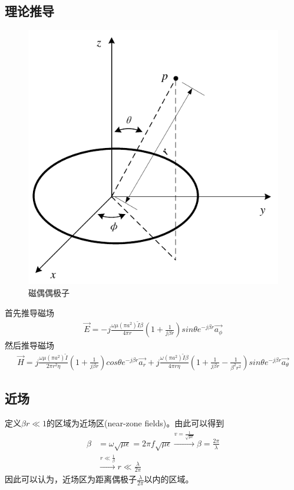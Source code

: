 \documentclass[lang=cn,11pt]{elegantpaper}
\begin{document}
\subsection{理论推导}
\begin{figure}[ht]
  \centering
  \includegraphics[width=0.3\linewidth]{figure//Magnetic_Dipole.pdf}
  \vspace{-0.3cm}
  \caption{磁偶偶极子}\label{fig:Magnetic_Dipole}
\end{figure}
首先推导磁场
\begin{equation}
  \begin{aligned}
    \vec{E} = -j\frac{\omega \mu (\pi a^2)\widetilde{I}\beta}{4\pi r}\left(1+\frac{1}{j\beta r}\right)sin\theta e^{-j\beta r}\vec{a_{\phi}}
\end{aligned}
\end{equation}
然后推导磁场
\begin{equation}
  \begin{aligned}
    \vec{H} = j\frac{\omega \mu (\pi a^2)\widetilde{I}}{2\pi r^2\eta}\left(1+\frac{1}{j\beta r}\right)cos\theta e^{-j\beta r}\vec{a_r} + j\frac{\omega (\pi a^2)\widetilde{I}\beta}{4\pi r \eta}\left(1+\frac{1}{j\beta r} - \frac{1}{{\beta}^2 r^2}\right)sin\theta e^{-j\beta r}\vec{a_{\theta}}
\end{aligned}
\end{equation}

\subsection{近场}
定义$\beta r \ll 1$的区域为近场区(near-zone fields)。由此可以得到
\begin{equation}
  \begin{aligned}
    \beta &= \omega\sqrt{\mu \epsilon} = 2\pi f \sqrt{\mu \epsilon} \xrightarrow{v = \frac{1}{\sqrt{\mu \epsilon}}} \beta = \frac{2\pi}{\lambda} \\
    &\xrightarrow{r\ll \frac{1}{\beta}} r\ll \frac{\lambda}{2\pi}
  \end{aligned}
\end{equation}
因此可以认为，近场区为距离偶极子$\frac{\lambda}{2\pi}$以内的区域。



\end{document}
